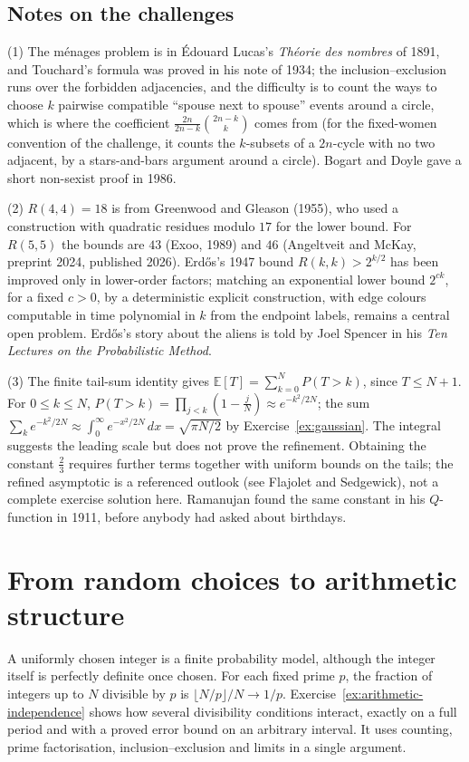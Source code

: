 \subsection*{Notes on the challenges}

(1) The m\'enages problem is in \'Edouard Lucas's \emph{Th\'eorie des nombres} of 1891, and Touchard's formula was proved in his note of 1934; the inclusion--exclusion runs over the forbidden adjacencies, and the difficulty is to count the ways to choose $k$ pairwise compatible ``spouse next to spouse'' events around a circle, which is where the coefficient $\frac{2n}{2n-k}\binom{2n-k}k$ comes from (for the fixed-women convention of the challenge, it counts the $k$-subsets of a $2n$-cycle with no two adjacent, by a stars-and-bars argument around a circle). Bogart and Doyle gave a short non-sexist proof in 1986.

(2) $R(4,4)=18$ is from Greenwood and Gleason (1955), who used a construction with quadratic residues modulo $17$ for the lower bound. For $R(5,5)$ the bounds are $43$ (Exoo, 1989) and $46$ (Angeltveit and McKay, preprint 2024, published 2026). Erd\H os's 1947 bound $R(k,k)>2^{k/2}$ has been improved only in lower-order factors; matching an exponential lower bound $2^{ck}$, for a fixed $c>0$, by a deterministic explicit construction, with edge colours computable in time polynomial in $k$ from the endpoint labels, remains a central open problem. Erd\H os's story about the aliens is told by Joel Spencer in his \emph{Ten Lectures on the Probabilistic Method}.

(3) The finite tail-sum identity gives $\mathbb E[T]=\sum_{k=0}^NP(T>k)$, since $T\le N+1$. For $0\le k\le N$, $P(T>k)=\prod_{j<k}(1-\frac jN)\approx e^{-k^2/2N}$; the sum $\sum_ke^{-k^2/2N}\approx\int_0^\infty e^{-x^2/2N}\,dx=\sqrt{\pi N/2}$ by Exercise~\ref{ex:gaussian}. The integral suggests the leading scale but does not prove the refinement. Obtaining the constant $\frac23$ requires further terms together with uniform bounds on the tails; the refined asymptotic is a referenced outlook (see Flajolet and Sedgewick), not a complete exercise solution here. Ramanujan found the same constant in his $Q$-function in 1911, before anybody had asked about birthdays.

\section*{From random choices to arithmetic structure}
A uniformly chosen integer is a finite probability model, although the integer
itself is perfectly definite once chosen. For each fixed prime $p$, the fraction
of integers up to $N$ divisible by $p$ is $\lfloor N/p\rfloor/N\to1/p$.
Exercise~\ref{ex:arithmetic-independence} shows how several divisibility
conditions interact, exactly on a full period and with a proved error bound on
an arbitrary interval. It uses counting, prime factorisation, inclusion--exclusion
and limits in a single argument.

